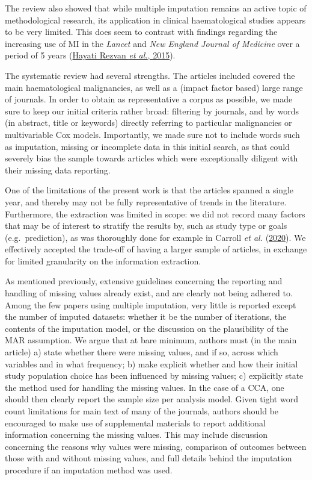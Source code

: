 \documentclass[
  letterpaper,
  DIV=11,
  numbers=noendperiod]{scrreprt}
\begin{document}
The review also showed that while multiple imputation remains an active
topic of methodological research, its application in clinical
haematological studies appears to be very limited. This does seem to
contrast with findings regarding the increasing use of MI in the
\emph{Lancet} and \emph{New England Journal of Medicine} over a period
of 5 years
(\protect\hyperlink{ref-hayatirezvanRiseMultipleImputation2015}{Hayati
Rezvan \emph{et al.}, 2015}).

The systematic review had several strengths. The articles included
covered the main haematological malignancies, as well as a (impact
factor based) large range of journals. In order to obtain as
representative a corpus as possible, we made sure to keep our initial
criteria rather broad: filtering by journals, and by words (in abstract,
title or keywords) directly referring to particular malignancies or
multivariable Cox models. Importantly, we made sure not to include words
such as imputation, missing or incomplete data in this initial search,
as that could severely bias the sample towards articles which were
exceptionally diligent with their missing data reporting.

One of the limitations of the present work is that the articles spanned
a single year, and thereby may not be fully representative of trends in
the literature. Furthermore, the extraction was limited in scope: we did
not record many factors that may be of interest to stratify the results
by, such as study type or goals (e.g.~prediction), as was thoroughly
done for example in Carroll \emph{et al.}
(\protect\hyperlink{ref-carrollHowAreMissing2020}{2020}). We effectively
accepted the trade-off of having a larger sample of articles, in
exchange for limited granularity on the information extraction.

As mentioned previously, extensive guidelines concerning the reporting
and handling of missing values already exist, and are clearly not being
adhered to. Among the few papers using multiple imputation, very little
is reported except the number of imputed datasets: whether it be the
number of iterations, the contents of the imputation model, or the
discussion on the plausibility of the MAR assumption. We argue that at
bare minimum, authors must (in the main article) a) state whether there
were missing values, and if so, across which variables and in what
frequency; b) make explicit whether and how their initial study
population choice has been influenced by missing values; c) explicitly
state the method used for handling the missing values. In the case of a
CCA, one should then clearly report the sample size per analysis model.
Given tight word count limitations for main text of many of the
journals, authors should be encouraged to make use of supplemental
materials to report additional information concerning the missing
values. This may include discussion concerning the reasons why values
were missing, comparison of outcomes between those with and without
missing values, and full details behind the imputation procedure if an
imputation method was used.
\end{document}
